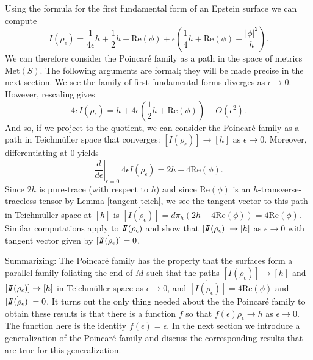 Using the formula for the first fundamental form of an Epstein surface we can compute
\[
I(\rho_\epsilon) = \frac{1}{4\epsilon} h + \frac{1}{2} h + \mathrm{Re}(\phi) + \epsilon \left( \frac{1}{4} h + \mathrm{Re}(\phi) + \frac{|\phi|^2}{h} \right).
\]
We can therefore consider the Poincar\'e family as a path in the space of metrics $\mathrm{Met}(S)$. 
The following arguments are formal; they will be made precise in the next section. 
We see the family of first fundamental forms diverges as $\epsilon \to 0$. 
However, rescaling gives
\[
4\epsilon I(\rho_\epsilon) = h + 4\epsilon \left( \frac{1}{2}h + \mathrm{Re}(\phi) \right) + O(\epsilon^2).
\]
And so, if we project to the quotient, we can consider the Poincar\'e family as a path in Teichm\"uller space that converges: $[I(\rho_\epsilon)] \to [h]$ as $\epsilon \to 0$. 
Moreover, differentiating at $0$ yields
\[
\left. \frac{d}{d\epsilon} \right|_{\epsilon = 0} \ 4\epsilon I(\rho_\epsilon) = 2h + 4 \mathrm{Re}(\phi).
\]
Since $2 h $ is pure-trace (with respect to $h$) and since $\mathrm{Re}(\phi)$ is an $h$-transverse-traceless tensor by Lemma \ref{tangent-teich}, we see the tangent vector to this path in Teichm\"uller space at $[h]$ is $\dot{[I(\rho_\epsilon)]} = d \pi_h (2h + 4 \mathrm{Re}(\phi)) = 4 \mathrm{Re}(\phi)$. Similar computations apply to $I\!\!I(\rho_\epsilon)$ and show that $[I\!\!I(\rho_\epsilon)] \to [h]$ as $\epsilon \to 0$ with tangent vector given by $\dot{[I\!\!I(\rho_\epsilon)]} = 0$. 

Summarizing: The Poincar\'e family has the property that the surfaces form a parallel family foliating the end of $M$ such that the paths $[I(\rho_\epsilon)] \to [h]$ and $[I\!\!I(\rho_\epsilon)] \to [h]$ in Teichm\"uller space as $\epsilon \to 0$, and $\dot{[I(\rho_\epsilon)]} = 4 \mathrm{Re}(\phi)$ and $\dot{[I\!\!I(\rho_\epsilon)]} = 0$. 
It turns out the only thing needed about the the Poincar\'e family to obtain these results is that there is a function $f$ so that $f(\epsilon)\rho_\epsilon \to h$ as $\epsilon \to 0$. 
The function here is the identity $f(\epsilon) = \epsilon$. 
In the next section we introduce a generalization of the Poincar\'e family and discuss the corresponding results that are true for this generalization.